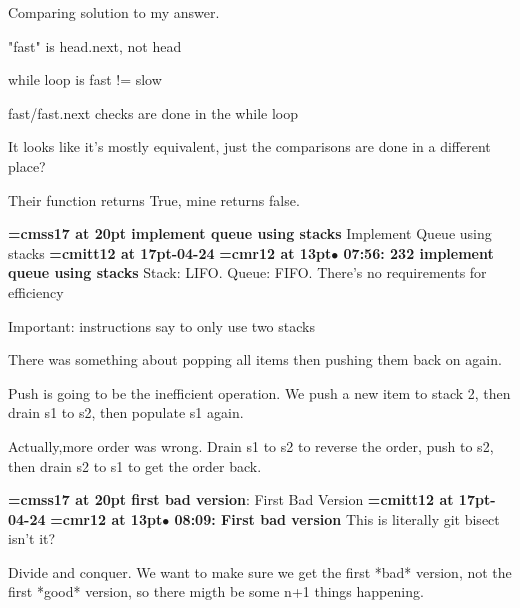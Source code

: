 Comparing solution to my answer.
\par

"fast" is head.next, not head
\par

while loop is fast != slow
\par

fast/fast.next checks are done in the while loop
\par

It looks like it's mostly equivalent, just the comparisons are done in a different place?
\par

Their function returns True, mine returns false.
\par

{\medskip\noindent\bf\font\titlefont=cmss17 at 20pt implement queue using stacks}\medskip
Implement Queue using stacks
{\medskip\noindent\bf\font\titlefont=cmitt12 at 17pt-04-24}\medskip
{\smallskip\noindent\bf\font\titlefont=cmr12 at 13pt\titlefont $\bullet$ 07:56: 232 implement queue using stacks}\smallskip
Stack: LIFO. Queue: FIFO. There's no requirements for efficiency
\par

Important: instructions say to only use two stacks
\par

There was something about popping all items then pushing them back on again.
\par

Push is going to be the inefficient operation. We push a new item to stack 2, then drain s1 to s2, then populate s1 again.
\par

Actually,more order was wrong. Drain s1 to s2 to reverse the order, push to s2, then drain s2 to s1 to get the order back.
\par

{\medskip\noindent\bf\font\titlefont=cmss17 at 20pt first bad version}: First Bad Version
{\medskip\noindent\bf\font\titlefont=cmitt12 at 17pt-04-24}\medskip
{\smallskip\noindent\bf\font\titlefont=cmr12 at 13pt\titlefont $\bullet$ 08:09: First bad version}\smallskip
This is literally git bisect isn't it?
\par

Divide and conquer. We want to make sure we get the first *bad* version, not the first *good* version, so there migth be some n+1 things happening.
\par

